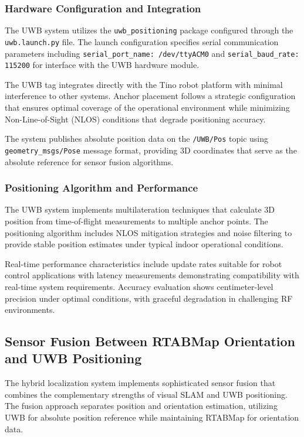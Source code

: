 \subsubsection{Hardware Configuration and Integration}

The UWB system utilizes the \texttt{uwb\_positioning} package configured through the \texttt{uwb.launch.py} file. The launch configuration specifies serial communication parameters including \texttt{serial\_port\_name: /dev/ttyACM0} and \texttt{serial\_baud\_rate: 115200} for interface with the UWB hardware module.

The UWB tag integrates directly with the Tino robot platform with minimal interference to other systems. Anchor placement follows a strategic configuration that ensures optimal coverage of the operational environment while minimizing Non-Line-of-Sight (NLOS) conditions that degrade positioning accuracy.

The system publishes absolute position data on the \texttt{/UWB/Pos} topic using \texttt{geometry\_msgs/Pose} message format, providing 3D coordinates that serve as the absolute reference for sensor fusion algorithms.

\subsubsection{Positioning Algorithm and Performance}

The UWB system implements multilateration techniques that calculate 3D position from time-of-flight measurements to multiple anchor points. The positioning algorithm includes NLOS mitigation strategies and noise filtering to provide stable position estimates under typical indoor operational conditions.

Real-time performance characteristics include update rates suitable for robot control applications with latency measurements demonstrating compatibility with real-time system requirements. Accuracy evaluation shows centimeter-level precision under optimal conditions, with graceful degradation in challenging RF environments.

\subsection{Sensor Fusion Between RTABMap Orientation and UWB Positioning}

The hybrid localization system implements sophisticated sensor fusion that combines the complementary strengths of visual SLAM and UWB positioning. The fusion approach separates position and orientation estimation, utilizing UWB for absolute position reference while maintaining RTABMap for orientation data.

